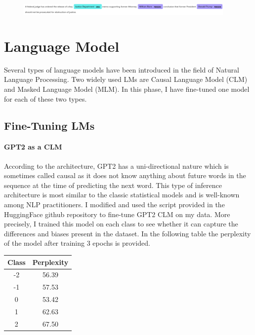\documentclass[11pt]{article}
\begin{document}
\begin{center}
  \begin{figure}[h!]
    \includegraphics[width=0.95\textwidth]{figs/dep_ner/ner_2.png}
  \end{figure}
\end{center}

\newpage

\section{Language Model}
Several types of language models have been introduced in the field of Natural Language Processing. Two widely used LMs are Causal Language Model (CLM) and Masked Language Model (MLM). In this phase, I have fine-tuned one model for each of these two types.

\subsection{Fine-Tuning LMs}

\paragraph{GPT2 as a CLM}
According to the architecture, GPT2 has a uni-directional nature which is sometimes called causal as it does not know anything about future words in the sequence at the time of predicting the next word. This type of inference architecture is most similar to the classic statistical models and is well-known among NLP practitioners.
\newline
I modified and used the script provided in the HuggingFace github repository to fine-tune GPT2 CLM on my data. More precisely, I trained this model on each class to see whether it can capture the differences and biases present in the dataset. In the following table the perplexity of the model after training 3 epochs is provided.

\begin{center}
\begin{tabular}{cc}
  \hline
  \textbf{Class} & \textbf{Perplexity} \\
  \hline
  \hline
  -2 & 56.39 \\
  \hline
  -1 & 57.53 \\
  \hline
  0 & 53.42 \\
  \hline
  1 & 62.63 \\
  \hline
  2 & 67.50 \\
  \hline
\end{tabular}
\end{center}
\end{document}
